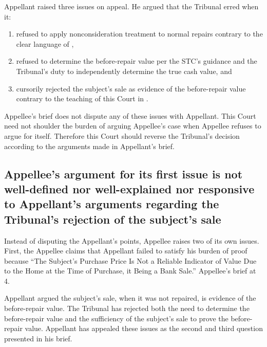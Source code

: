 \documentclass[12pt,\documentclassflag]{michiganCourtOfAppealsBrief}
\begin{document}
Appellant raised three issues on appeal. He argued that the Tribunal erred when it:

\begin{enumerate}
\item refused to apply nonconsideration treatment to normal repairs contrary to the clear language of \mathieuGast,
\item refused to determine the before-repair value per the STC's guidance and the Tribunal's duty to independently determine the true cash value, and
\item cursorily rejected the subject's sale as evidence of the before-repair value contrary to the teaching of this Court in \cite{Jones & Laughlin}.
\end{enumerate}


Appellee's brief does not dispute any of these issues with Appellant. This Court need not shoulder the burden of arguing Appellee's case when Appellee refuses to argue for itself. Therefore this Court should reverse the Tribunal's decision according to the arguments made in Appellant's brief.

\subsection{Appellee's argument for its first issue is not well-defined nor well-explained nor responsive to Appellant's arguments regarding the Tribunal's rejection of the subject's sale}
 
Instead of disputing the Appellant's points, Appellee raises two of its own issues. First, the Appellee claims that Appellant failed to satisfy his burden of proof because ``The Subject's Purchase Price Is Not a Reliable Indicator of Value Due to the Home at the Time of Purchase, it Being a Bank Sale.'' Appellee's brief at 4.

Appellant argued the subject's sale, when it was not repaired, is evidence of the before-repair value. The Tribunal has rejected both the need to determine the before-repair value and the sufficiency of the subject's sale to prove the before-repair value. Appellant has appealed these issues as the second and third question presented in his brief.
\end{document}
